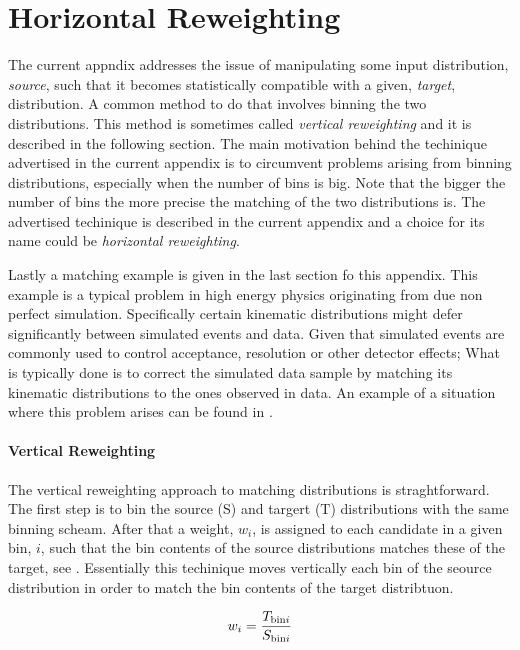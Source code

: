 
\chapter{Horizontal Reweighting}
\label{AppendixB}

The current appndix addresses the issue of manipulating some input distribution, {\it source}, such that
it becomes statistically compatible with a given, {\it target}, distribution. A common method to do that
involves binning the two distributions. This method is sometimes called {\it vertical reweighting}
and it is described in the following section. The main motivation behind the techinique advertised in the current
appendix is to circumvent problems arising from binning distributions, especially when the number of
bins is big. Note that the bigger the number of bins the more precise the matching of the two distributions
is. The advertised techinique is described in the current appendix and a choice for its name could be {\it horizontal reweighting}.

Lastly a matching example is given in the last section fo this appendix. This example is a typical problem
in high energy physics originating from due non perfect simulation. Specifically certain kinematic
distributions might defer significantly between simulated events and data. Given that simulated
events are commonly used to control acceptance, resolution or other detector effects; What is typically
done is to correct the simulated data sample by matching its kinematic distributions to the ones observed in data.
An example of a situation where this problem arises can be found in .

\subsubsection{Vertical Reweighting}
The vertical reweighting approach to matching distributions is straghtforward.
The first step is to bin the source (S) and targert (T) distributions with the same binning scheam.
After that a weight, $w_i$, is assigned to each candidate in a given bin, $i$, such that the bin
contents of the source distributions matches these of the target, see .
Essentially this techinique moves vertically each bin of the seource distribution in order to match
the bin contents of the target distribtuon.

\begin{equation}
  \centering
  w_i = \frac{T_{{\rm bin}i}}{S_{{\rm bin}i}}
\label{vert_rew}
\end{equation}

